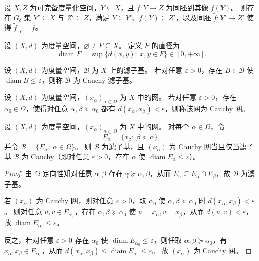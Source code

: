 \documentclass[lang=cn,a4paper,newtx,figureplace=section,tableplace=section]{elegantbook}
\begin{document}
\begin{theorem}\label{thm:lavrentiev-extension}
  设 $X,Z$ 为可完备度量化空间，$Y\subseteq X$，且 $f:Y\to Z$ 为同胚到其像 $f(Y)$。
  则存在 $G_\delta$ 集 $Y'\subseteq X$ 与 $Z'\subseteq Z$，满足 $Y\subseteq Y'$、$f(Y)\subseteq Z'$，以及同胚 $\widetilde f:Y'\to Z'$ 使得 $\widetilde f\vert_{Y}=f$。
\end{theorem}

\begin{definition}[直径]
  设 $(X,d)$ 为度量空间，$\varnothing\ne F\subseteq X$。
  定义 $F$ 的直径为
  \[
    \operatorname{diam}F=\sup\{d(x,y):\ x,y\in F\}\in[0,+\infty].
  \]
\end{definition}

\begin{definition}
  设 $(X,d)$ 为度量空间，$\mathcal B$ 为 $X$ 上的滤子基。
  若对任意 $\varepsilon>0$，存在 $B\in\mathcal B$ 使 $\operatorname{diam}B\le\varepsilon$，则称 $\mathcal B$ 为 Cauchy 滤子基。
\end{definition}

\begin{definition}[Cauchy 网]
  设 $(X,d)$ 为度量空间，$(x_\alpha)_{\alpha\in\Omega}$ 为 $X$ 中的网。
  若对任意 $\varepsilon>0$，存在 $\alpha_0\in\Omega$，使得对任意 $\alpha,\beta\succeq\alpha_0$ 都有 $d(x_\alpha,x_\beta)<\varepsilon$，则称该网为 Cauchy 网。
\end{definition}

\begin{proposition}\label{prop:cauchy-net-tail-filter-base}
  设 $(X,d)$ 为度量空间，$(x_\alpha)_{\alpha\in\Omega}$ 为 $X$ 中的网。
  对每个 $\alpha\in\Omega$，令
  \[
    E_\alpha=\{x_\beta:\ \beta\succeq\alpha\},
  \]
  并令 $\mathcal B=\{E_\alpha:\ \alpha\in\Omega\}$。
  则 $\mathcal B$ 为滤子基，且 $(x_\alpha)$ 为 Cauchy 网当且仅当滤子基 $\mathcal B$ 为 Cauchy（即对任意 $\varepsilon>0$，存在 $\alpha$ 使 $\operatorname{diam}E_\alpha\le\varepsilon$）。
\end{proposition}
\begin{proof}
  由 $\Omega$ 定向性知对任意 $\alpha,\beta$ 存在 $\gamma\succeq\alpha,\beta$，从而 $E_\gamma\subseteq E_\alpha\cap E_\beta$，故 $\mathcal B$ 为滤子基。

  若 $(x_\alpha)$ 为 Cauchy 网，则对任意 $\varepsilon>0$，取 $\alpha_0$ 使 $\alpha,\beta\succeq\alpha_0$ 时 $d(x_\alpha,x_\beta)<\varepsilon$。
  则对任意 $u,v\in E_{\alpha_0}$，存在 $\alpha,\beta\succeq\alpha_0$ 使 $u=x_\alpha,v=x_\beta$，从而 $d(u,v)<\varepsilon$，故 $\operatorname{diam}E_{\alpha_0}\le\varepsilon$。

  反之，若对任意 $\varepsilon>0$ 存在 $\alpha_0$ 使 $\operatorname{diam}E_{\alpha_0}\le\varepsilon$，则任取 $\alpha,\beta\succeq\alpha_0$，有 $x_\alpha,x_\beta\in E_{\alpha_0}$，从而 $d(x_\alpha,x_\beta)\le\operatorname{diam}E_{\alpha_0}\le\varepsilon$。
  故 $(x_\alpha)$ 为 Cauchy 网。
\end{proof}
\end{document}
